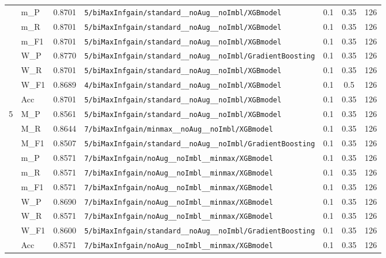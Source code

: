 \begin{table}[htbp]
\begin{tabular}{|c|l|c|>{\ttfamily\footnotesize}p{7.2cm}|c|c|c|}
 & m\_P & 0.8701 & \texttt{5/biMaxInfgain/standard\_\_noAug\_\_noImbl/XGBmodel} & 0.1 & 0.35  & 126 \\ 
 & m\_R & 0.8701 & \texttt{5/biMaxInfgain/standard\_\_noAug\_\_noImbl/XGBmodel} & 0.1 & 0.35  & 126 \\ 
 & m\_F1 & 0.8701 & \texttt{5/biMaxInfgain/standard\_\_noAug\_\_noImbl/XGBmodel} & 0.1 & 0.35  & 126 \\ 
 & W\_P & 0.8770 & \texttt{5/biMaxInfgain/standard\_\_noAug\_\_noImbl/GradientBoosting} & 0.1 & 0.35  & 126 \\ 
 & W\_R & 0.8701 & \texttt{5/biMaxInfgain/standard\_\_noAug\_\_noImbl/XGBmodel} & 0.1 & 0.35  & 126 \\ 
 & W\_F1 & 0.8689 & \texttt{4/biMaxInfgain/standard\_\_noAug\_\_noImbl/XGBmodel} & 0.1 & 0.5  & 126 \\ 
 & Acc & 0.8701 & \texttt{5/biMaxInfgain/standard\_\_noAug\_\_noImbl/XGBmodel} & 0.1 & 0.35  & 126 \\ 
\hline
\multirow{10}{*}{5} & M\_P & 0.8561 & \texttt{5/biMaxInfgain/standard\_\_noAug\_\_noImbl/XGBmodel} & 0.1 & 0.35  & 126 \\ 
 & M\_R & 0.8644 & \texttt{7/biMaxInfgain/minmax\_\_noAug\_\_noImbl/XGBmodel} & 0.1 & 0.35  & 126 \\ 
 & M\_F1 & 0.8507 & \texttt{5/biMaxInfgain/standard\_\_noAug\_\_noImbl/GradientBoosting} & 0.1 & 0.35  & 126 \\ 
 & m\_P & 0.8571 & \texttt{7/biMaxInfgain/noAug\_\_noImbl\_\_minmax/XGBmodel} & 0.1 & 0.35  & 126 \\ 
 & m\_R & 0.8571 & \texttt{7/biMaxInfgain/noAug\_\_noImbl\_\_minmax/XGBmodel} & 0.1 & 0.35  & 126 \\ 
 & m\_F1 & 0.8571 & \texttt{7/biMaxInfgain/noAug\_\_noImbl\_\_minmax/XGBmodel} & 0.1 & 0.35  & 126 \\ 
 & W\_P & 0.8690 & \texttt{7/biMaxInfgain/noAug\_\_noImbl\_\_minmax/XGBmodel} & 0.1 & 0.35  & 126 \\ 
 & W\_R & 0.8571 & \texttt{7/biMaxInfgain/noAug\_\_noImbl\_\_minmax/XGBmodel} & 0.1 & 0.35  & 126 \\ 
 & W\_F1 & 0.8600 & \texttt{5/biMaxInfgain/standard\_\_noAug\_\_noImbl/GradientBoosting} & 0.1 & 0.35  & 126 \\ 
 & Acc & 0.8571 & \texttt{7/biMaxInfgain/noAug\_\_noImbl\_\_minmax/XGBmodel} & 0.1 & 0.35  & 126 \\ 
\hline
\end{tabular}
\end{table}